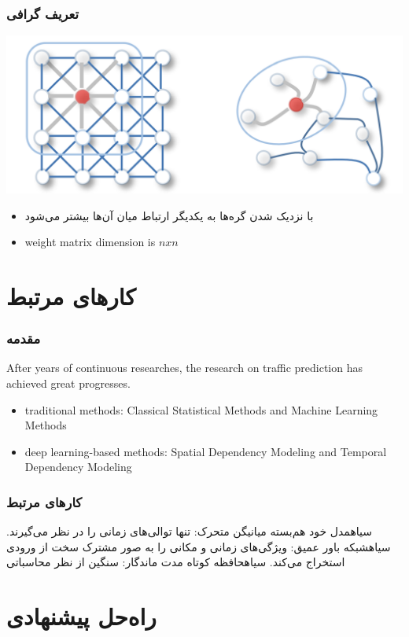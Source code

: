 \documentclass{beamer}
\begin{document}
\begin{persian}
\begin{frame}
  \frametitle{تعریف گرافی}
  \includegraphics[width=\textwidth]{img/convolution.png}
  \begin{itemize}
    \item با نزدیک شدن گره‌ها به یکدیگر ارتباط میان آن‌ها بیشتر می‌شود
    \item weight matrix dimension is $nxn$
  \end{itemize}
\end{frame}

\section{کارهای مرتبط}

\begin{frame}
  \frametitle{مقدمه}
  After years of continuous researches, the research on traffic prediction has achieved great progresses.
  \begin{itemize}
    \item traditional methods: Classical Statistical Methods and Machine Learning Methods
    \item deep learning-based methods: Spatial Dependency Modeling and Temporal Dependency Modeling
  \end{itemize}
\end{frame}

\begin{frame}
  \frametitle{کارهای مرتبط}
  \begin{itemize}
   ‌سیاه{مدل خود هم‌بسته میانیگن متحرک}: تنها توالی‌های زمانی را در نظر می‌گیرند.
   ‌سیاه{شبکه باور عمیق}: ویژگی‌های زمانی و مکانی را به صور مشترک سخت از ورودی استخراج می‌کند.
   ‌سیاه{حافظه کوتاه مدت ماندگار}: سنگین از نظر محاسباتی
  \end{itemize}
\end{frame}

\section{راه‌حل پیشنهادی}


\end{persian}
\end{document}
